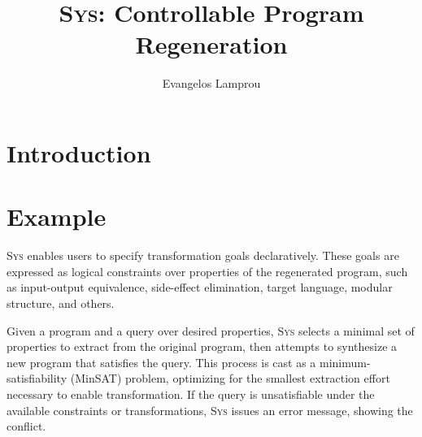 \documentclass[sigplan]{acmart}
\newcommand{\sys}{{\scshape Sys}\xspace}
\begin{document}
\title{\sys: Controllable Program Regeneration}
\author{Evangelos Lamprou}




\begin{abstract}
\end{abstract}

\maketitle

\section{Introduction}


\section{Example}
\sys enables users to specify transformation goals declaratively.
These goals are expressed as logical constraints over properties of the
regenerated program, such as input-output equivalence, side-effect elimination,
target language, modular structure, and others.

Given a program and a query over desired properties, \sys selects a minimal set
of properties to extract from the original program, then attempts to synthesize
a new program that satisfies the query.
This process is cast as a
minimum-satisfiability (MinSAT) problem, optimizing for the smallest extraction
effort necessary to enable transformation.
If the query is unsatisfiable under
the available constraints or transformations, \sys issues an error
message, showing the conflict.
\end{document}
